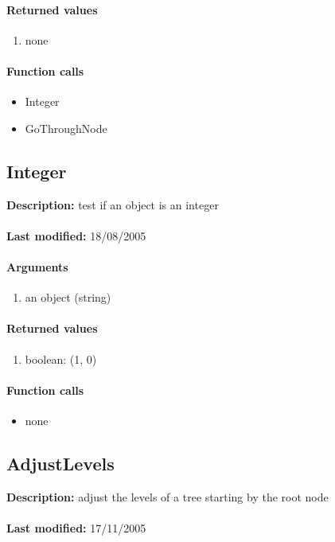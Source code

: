 \paragraph{Returned values}
\begin{enumerate}
\item none
\end{enumerate}

\paragraph{Function calls}
\begin{itemize}
\item Integer
\item GoThroughNode
\end{itemize}

\subsection{Integer}
\textbf{Description:} test if an object is an integer\\
\\\textbf{Last modified:} 18/08/2005

\paragraph{Arguments}
\begin{enumerate}
\item an object (string)
\end{enumerate}

\paragraph{Returned values}
\begin{enumerate}
\item boolean: (1, 0)
\end{enumerate}

\paragraph{Function calls}
\begin{itemize}
\item none
\end{itemize}

\subsection{AdjustLevels}
\textbf{Description:} adjust the levels of a tree starting by the root node\\
\\\textbf{Last modified:} 17/11/2005

